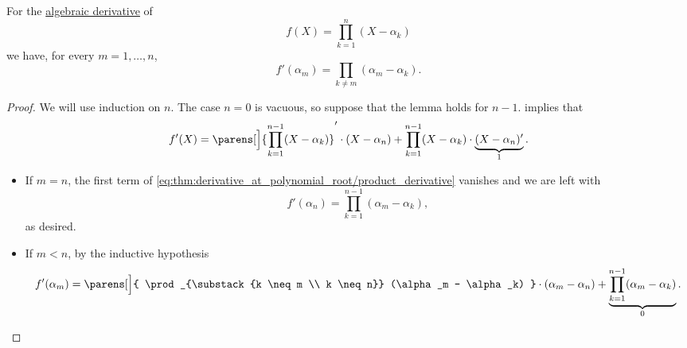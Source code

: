 \begin{lemma}\label{thm:derivative_at_polynomial_root}
  For the \hyperref[def:algebraic_derivative]{algebraic derivative} of
  \begin{equation*}
    f(X) = \prod_{k=1}^n (X - \alpha_k)
  \end{equation*}
  we have, for every \( m = 1, \ldots, n \),
  \begin{equation}\label{eq:thm:derivative_at_polynomial_root}
    f'(\alpha_m) = \prod_{k \neq m} (\alpha_m - \alpha_k).
  \end{equation}
\end{lemma}
\begin{proof}
  We will use induction on \( n \). The case \( n = 0 \) is vacuous, so suppose that the lemma holds for \( n - 1 \).  implies that
  \begin{equation}\label{eq:thm:derivative_at_polynomial_root/product_derivative}
    f'(X) = \parens[\Big]{ \prod_{k=1}^{n-1} (X - \alpha_k) }' \cdot (X - \alpha_n) + \prod_{k=1}^{n-1} (X - \alpha_k) \cdot \underbrace{(X - \alpha_n)'}_{1}.
  \end{equation}

  \begin{itemize}
    \item If \( m = n \), the first term of \eqref{eq:thm:derivative_at_polynomial_root/product_derivative} vanishes and we are left with
    \begin{equation*}
      f'(\alpha_n) = \prod_{k=1}^{n-1} (\alpha_m - \alpha_k),
    \end{equation*}
    as desired.

    \item If \( m < n \), by the inductive hypothesis
    \begin{equation*}
      f'(\alpha_m) = \parens[\Big]{ \prod_{\substack{k \neq m \\ k \neq n}} (\alpha_m - \alpha_k) } \cdot (\alpha_m - \alpha_n) + \underbrace{\prod_{k=1}^{n-1} (\alpha_m - \alpha_k)}_{0}.
    \end{equation*}
  \end{itemize}
\end{proof}

